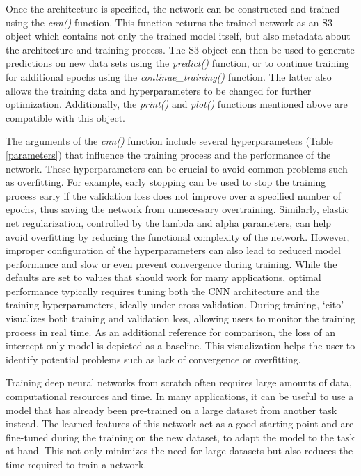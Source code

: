 \documentclass[12pt,twoside]{scrreport}
\newcommand{\pkg}[1]{`#1'}
\newcommand{\fn}[2][]{\textit{#2(}#1\textit{)}}
\begin{document}
Once the architecture is specified, the network can be constructed and trained using the \fn{cnn} function. This function returns the trained network as an S3 object which contains not only the trained model itself, but also metadata about the architecture and training process. The S3 object can then be used to generate predictions on new data sets using the \fn{predict} function, or to continue training for additional epochs using the \fn{continue\_training} function. The latter also allows the training data and hyperparameters to be changed for further optimization. Additionally, the \fn{print} and \fn{plot} functions mentioned above are compatible with this object.

The arguments of the \fn{cnn} function include several hyperparameters (Table \ref{parameters}) that influence the training process and the performance of the network. These hyperparameters can be crucial to avoid common problems such as overfitting. For example, early stopping can be used to stop the training process early if the validation loss does not improve over a specified number of epochs, thus saving the network from unnecessary overtraining. Similarly, elastic net regularization, controlled by the lambda and alpha parameters, can help avoid overfitting by reducing the functional complexity of the network. However, improper configuration of the hyperparameters can also lead to reduced model performance and slow or even prevent convergence during training. While the defaults are set to values that should work for many applications, optimal performance typically requires tuning both the CNN architecture and the training hyperparameters, ideally under cross-validation. During training, \pkg{cito} visualizes both training and validation loss, allowing users to monitor the training process in real time. As an additional reference for comparison, the loss of an intercept-only model is depicted as a baseline. This visualization helps the user to identify potential problems such as lack of convergence or overfitting.

Training deep neural networks from scratch often requires large amounts of data, computational resources and time. In many applications, it can be useful to use a model that has already  been pre-trained on a large dataset from another task instead. The learned features of this network act as a good starting point and are fine-tuned during the training on the new dataset, to adapt the model to the task at hand. This not only minimizes the need for large datasets but also reduces the time required to train a network.
\end{document}
